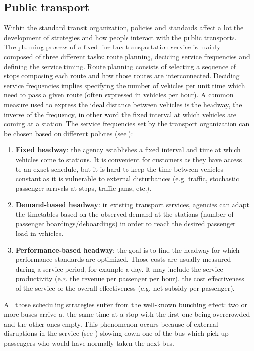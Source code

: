 \documentclass[12pt,a4paper]{article}
\begin{document}
\subsection{Public transport}\label{pubtrans}
Within the standard transit organization, policies and standards affect a lot the development of strategies and how people interact with the public transports. The planning process of a fixed line bus transportation service is mainly composed of three different tasks: route planning, deciding service frequencies and defining the service timing. Route planning consists of selecting a sequence of stops composing each route and how those routes are interconnected. Deciding service frequencies implies specifying the number of vehicles per unit time which need to pass a given route (often expressed in vehicles per hour). A common measure used to express the ideal distance between vehicles is the headway, the inverse of the frequency, in other word the fixed interval at which vehicles are coming at a station. The service frequencies set by the transport organization can be chosen based on different policies (see \cite{tcrp}): 
\begin{enumerate}
\item \textbf{Fixed headway}: the agency establishes a fixed interval and time at which vehicles come to stations. It is convenient for customers as they have access to an exact schedule, but it is hard to keep the time between vehicles constant as it is vulnerable to external disturbances (e.g. traffic, stochastic passenger arrivals at stops, traffic jams, etc.).
\item \textbf{Demand-based headway}: in existing transport services, agencies can adapt the timetables based on the observed demand at the stations (number of passenger boardings/deboardings) in order to reach the desired passenger load in vehicles.
\item \textbf{Performance-based headway}: the goal is to find the headway for which performance standards are optimized. Those costs are usually measured during a service period, for example a day. It may include the service productivity (e.g. the revenue per passenger per hour), the cost effectiveness of the service or the overall effectiveness (e.g. net subsidy per passenger). 
\end{enumerate}

All those scheduling strategies suffer from the well-known bunching effect: two or more buses arrive at the same time at a stop with the first one being overcrowded and the other ones empty. This phenomenon occurs because of external disruptions in the service (see \cite{hwadherence}) slowing down one of the bus which pick up passengers who would have normally taken the next bus. 
\end{document}
